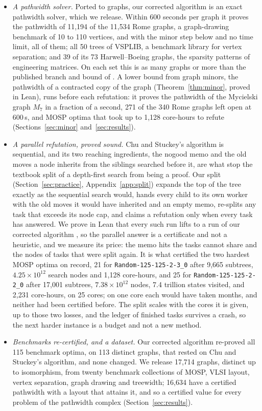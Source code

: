 \begin{itemize}
  on each group of benchmarks we measured.
\item \emph{A pathwidth solver.} Ported to graphs, our corrected algorithm is an
  exact pathwidth solver, which we release. Within 600 seconds per graph it
  proves the pathwidth of 11,194 of the 11,534 Rome graphs, a graph-drawing
  benchmark of 10 to 110 vertices, and with the minor step below and no time
  limit, all of them; all 50 trees of VSPLIB, a benchmark library
  for vertex separation; and 39 of its 73 Harwell--Boeing graphs, the sparsity
  patterns of engineering matrices. On each set this is as many graphs or more than the published branch and bound of
  \citet{CoudertMazauricNisse2016}. A lower bound from graph minors, the
  pathwidth of a contracted copy of the graph (Theorem~\ref{thm:minor}, proved
  in Lean), runs before each refutation: it proves the pathwidth of the
  Mycielski graph $M_7$ in a fraction of a second, 271 of the 340 Rome graphs
  left open at 600\,s, and MOSP optima that took up to 1,128 core-hours to
  refute (Sections~\ref{sec:minor} and~\ref{sec:results}).
\item \emph{A parallel refutation, proved sound.} Chu and Stuckey's algorithm is
  sequential, and its two reaching ingredients, the nogood memo and the old
  moves a node inherits from the siblings searched before it, are what stop
  the textbook split of a depth-first search from being a proof. Our split
  (Section~\ref{sec:practice}, Appendix~\ref{app:split}) expands the top of
  the tree exactly as the sequential search would, hands every child to its
  own worker with the old moves it would have inherited and an empty memo,
  re-splits any task that exceeds its node cap, and claims a refutation only
  when every task has answered. We prove in Lean that every such run lifts to
  a run of our corrected algorithm , so the parallel answer is a
  certificate and not a heuristic, and we measure its price: the memo hits
  the tasks cannot share and the nodes of tasks that were split again. It is
  what certified the two hardest MOSP optima on record, 21 for
  \texttt{Random-125-125-2-3\_0} after 9,665 subtrees, $4.25\times10^{12}$
  search nodes and 1,128 core-hours, and 25 for
  \texttt{Random-125-125-2-2\_0} after 17,001 subtrees, $7.38\times10^{12}$
  nodes, 7.4 trillion states visited, and 2,231 core-hours, on 25 cores; on one core each would have taken months, and
  neither had been certified before. The split scales with the cores it is
  given, up to those two losses, and the ledger of finished tasks survives a
  crash, so the next harder instance is a budget and not a new method.
\item \emph{Benchmarks re-certified, and a dataset.} Our corrected algorithm
  re-proved all 115 benchmark optima, on 113 distinct graphs, that rested on
  Chu and Stuckey's algorithm, and none changed. We release 17,714 graphs, distinct
  up to isomorphism, from twenty benchmark collections of MOSP, VLSI layout,
  vertex separation, graph drawing and treewidth; 16,634 have a certified
  pathwidth with a layout that attains it, and so a certified value for every
  problem of the pathwidth complex (Section~\ref{sec:results}).
\end{itemize}

